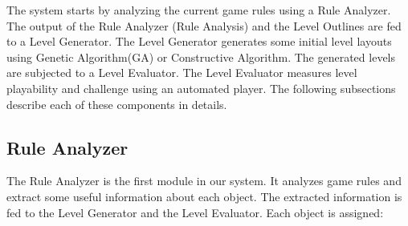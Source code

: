 \documentclass[letterpaper]{article}
\begin{document}
The system starts by analyzing the current game rules using a Rule Analyzer. The output of the Rule Analyzer (Rule Analysis) and the Level Outlines are fed to a Level Generator. The Level Generator generates some initial level layouts using Genetic Algorithm(GA) or Constructive Algorithm. The generated levels are subjected to a Level Evaluator. The Level Evaluator measures level playability and challenge using an automated player. The following subsections describe each of these components in details.

\subsection{Rule Analyzer}
The Rule Analyzer is the first module in our system. It analyzes game rules and extract some useful information about each object. The extracted information is fed to the Level Generator and the Level Evaluator. Each object is assigned:
\end{document}
